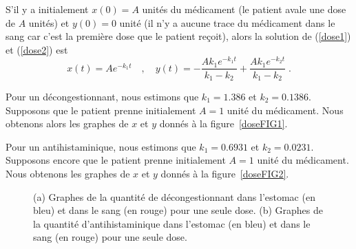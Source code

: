 {\begin{egg}
S'il y a initialement $x(0)=A$ unités du médicament (le patient
avale une dose de $A$ unités) et $y(0)=0$ unité (il n'y a aucune
trace du médicament dans le sang car c'est la première dose que le
patient reçoit), alors la solution de (\ref{dose1}) et (\ref{dose2}) est 
\[
x(t) = A e^{-k_1 t} \quad , \quad
y(t) = -\frac{A k_1 e^{-k_1 t}}{k_1 - k_2}
+ \frac{A k_1 e^{-k_2 t}}{k_1 - k_2} \; .
\]

Pour un décongestionnant, nous estimons que
$k_1 = 1.386$ et $k_2 = 0.1386$.   Supposons que le patient prenne
initialement $A=1$ unité du médicament.  Nous obtenons alors les graphes de
$x$ et $y$ donnés à la figure~\ref{doseFIG1}.

Pour un antihistaminique, nous estimons que $k_1=0.6931$ et
$k_2=0.0231$.  Supposons encore que le patient prenne
initialement $A=1$ unité du médicament.  Nous obtenons les graphes de
$x$ et $y$ donnés à la figure~\ref{doseFIG2}.

\begin{figure}
\centering
{}
\qquad
{}
\caption[Graphes de la quantité de décongestionnant et
d'antihistaminique dans l'estomac et dans le sang pour une seule dose]
{(a) Graphes de la quantité de décongestionnant dans l'estomac (en
bleu) et dans le sang (en rouge) pour une seule dose.
(b) Graphes de la quantité d'antihistaminique dans l'estomac (en
bleu) et dans le sang (en rouge) pour une seule dose.}\label{doseFIG12}
\end{figure}


\end{egg}}
